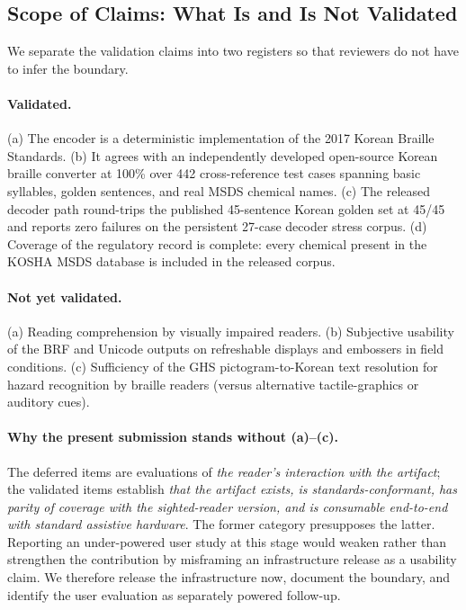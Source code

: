 \documentclass[journal]{IEEEtran}
\begin{document}
\subsection{Scope of Claims: What Is and Is Not Validated}
\label{sec:scope-of-claims}

We separate the validation claims into two registers so that reviewers do not have to infer the boundary.

\paragraph{Validated.}
(a) The encoder is a deterministic implementation of the 2017 Korean Braille Standards. (b) It agrees with an independently developed open-source Korean braille converter at 100\% over 442 cross-reference test cases spanning basic syllables, golden sentences, and real MSDS chemical names. (c) The released decoder path round-trips the published 45-sentence Korean golden set at 45/45 and reports zero failures on the persistent 27-case decoder stress corpus. (d) Coverage of the regulatory record is complete: every chemical present in the KOSHA MSDS database is included in the released corpus.

\paragraph{Not yet validated.}
(a) Reading comprehension by visually impaired readers. (b) Subjective usability of the BRF and Unicode outputs on refreshable displays and embossers in field conditions. (c) Sufficiency of the GHS pictogram-to-Korean text resolution for hazard recognition by braille readers (versus alternative tactile-graphics or auditory cues).

\paragraph{Why the present submission stands without (a)--(c).}
The deferred items are evaluations of \emph{the reader's interaction with the artifact}; the validated items establish \emph{that the artifact exists, is standards-conformant, has parity of coverage with the sighted-reader version, and is consumable end-to-end with standard assistive hardware}. The former category presupposes the latter. Reporting an under-powered user study at this stage would weaken rather than strengthen the contribution by misframing an infrastructure release as a usability claim. We therefore release the infrastructure now, document the boundary, and identify the user evaluation as separately powered follow-up.
\end{document}
